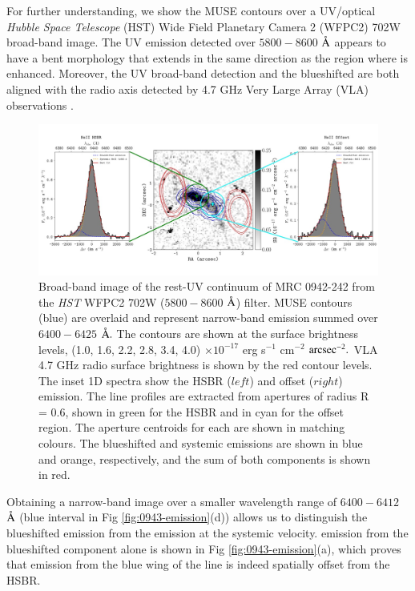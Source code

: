 For further understanding, we show the MUSE  contours over a UV/optical {\it Hubble Space Telescope} (HST) Wide Field Planetary Camera 2 (WFPC2) 702W broad-band image. The UV emission detected over $5800 - 8600$ $\mbox{\normalfont\AA }$ appears to have a bent morphology that extends in the same direction as the region where  is enhanced. Moreover, the UV broad-band detection and the blueshifted  are both aligned with the radio axis detected by 4.7 GHz Very Large Array (VLA) observations \citep{carilli1997,pentericci1999}. 

\begin{figure}
\centering
\hspace*{-50pt}
\includegraphics[width=1.2\textwidth]{plots_chp3/HeII_nucleus_offset_NB_img.jpg}
\caption[HST rest-UV image overlaid with MUSE  and VLA 4.7 GHz contours]{Broad-band image of the rest-UV continuum of MRC 0942-242 from the {\it HST} WFPC2 702W ($5800 - 8600$ $\mbox{\normalfont\AA }$) filter. MUSE contours (blue) are overlaid and represent narrow-band emission summed over $6400 - 6425$ $\mbox{\normalfont\AA }.$ The contours are shown at the surface brightness levels, (1.0, 1.6, 2.2, 2.8, 3.4, 4.0) $\times 10^{-17}$ erg s$^{-1}$ cm$^{-2}$ $ {\rm arcsec}^{-2}.$ VLA 4.7 GHz radio surface brightness is shown by the red contour levels. The inset 1D spectra show the HSBR ($left$) and offset ($right$)  emission. The line profiles are extracted from apertures of radius R = 0.6\arcsec, shown in green for the HSBR and in cyan for the offset region. The aperture centroids for each are shown in matching colours. The blueshifted and systemic  emissions are shown in blue and orange, respectively, and the sum of both components is shown in red. }
\label{fig:hst-img-muse-contours}
\end{figure}

Obtaining a narrow-band image over a smaller wavelength range of $6400 - 6412$ $\mbox{\normalfont\AA }$ (blue interval in Fig \ref{fig:0943-emission}(d)) allows us to distinguish the blueshifted  emission from the  emission at the systemic velocity.  emission from the blueshifted component alone is shown in Fig \ref{fig:0943-emission}(a), which proves that emission from the blue wing of the  line is indeed spatially offset from the HSBR.

